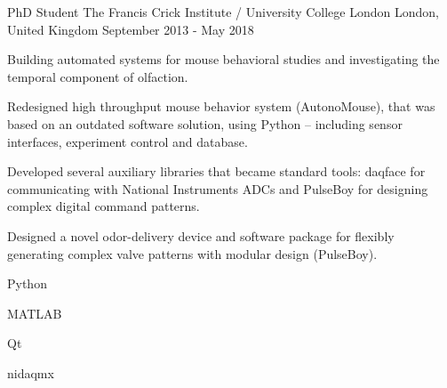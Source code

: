 \begin{cventries}
  \cventry%
    {PhD Student} %
    {The Francis Crick Institute / University College London} %
    {London, United Kingdom} %
    {September 2013 \-- May 2018} %
    {%
      \begin{cvsentence}Building automated systems for mouse behavioral studies and investigating the temporal component of olfaction.\end{cvsentence}
      \begin{cvitems} %
        \item {Redesigned high throughput mouse behavior system (AutonoMouse), that was based on an outdated software solution, using Python – including sensor interfaces, experiment control and database.}
        \item {Developed several auxiliary libraries that became standard tools: daqface for communicating with National Instruments ADCs and PulseBoy for designing complex digital command patterns.  }
        \item {Designed a novel odor-delivery device and software package for ﬂexibly generating complex valve patterns with modular design (PulseBoy).}
      \end{cvitems}
    }
    \begin{cventryskills}
      \item Python
      \item MATLAB
      \item Qt
      \item nidaqmx
    \end{cventryskills}
\end{cventries}
